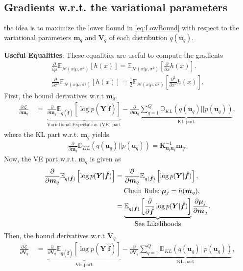 \documentclass[9pt]{article}
\providecommand{\ve}[1]{{\bm{#1}}}%
\providecommand{\mat}[1]{{\bm{#1}}} %
\DeclareMathOperator{\igual}{\!\,=\!\,}
\providecommand{\ve}[1]{{\mathbf{#1}}}
\providecommand{\mat}[1]{{\mathbf{#1}}}
\newcommand{\fracpartial}[2]{\frac{\partial #1}{\partial  #2}} %
\newcommand{\gauss}{\mathcal{N}} %
\begin{document}
\subsection{Gradients w.r.t. the variational parameters} 
the idea is to maximize the lower bound in \cref{eq:LowBound} with respect to the variational parameters $\ve{m}_q$ and $\mat{V}_q$ of each distribution $q(\ve{u}_q)$. 

\textbf{Useful Equalities}: These equalities \cite{hensman2015scalable} are useful to compute the gradients 
\begin{align}
\fracpartial{}{\mu}\mathbb{E}_{\gauss(x|\mu,\sigma^2)}\left[h(x)\right] = \mathbb{E}_{\gauss(x|\mu,\sigma^2)}\left[\fracpartial{}{x}h(x)\right].\\
\fracpartial{}{\sigma^2}\mathbb{E}_{\gauss(x|\mu,\sigma^2)}\left[h(x)\right] = \frac{1}{2}\mathbb{E}_{\gauss(x|\mu,\sigma^2)}\left[\fracpartial{^2}{x^2}h(x)\right].
\end{align}
First, the bound derivatives w.r.t $\ve{m}_q$.
\begin{align}
\fracpartial{\mathcal{L}}{\ve{m}_q} &\igual \underbrace{\fracpartial{}{\ve{m}_q}\mathbb{E}_{q(\hat{\ve{f}})}\left[\log p(\mat{Y}|\hat{\ve{f}})\right]}_{\mbox{Variational Expectation--(VE) part}} - \fracpartial{}{\ve{m}_q}\underbrace{\sum_{q=1}^{Q}\mathbb{D}_{KL}(q(\ve{u}_q)||p(\ve{u}_q))}_{\mbox{KL part}},
\end{align}
where the KL part w.r.t. $\ve{m}_q$ yields
\begin{align}
\fracpartial{}{\ve{m}_q}{\mathbb{D}_{KL}(q(\ve{u}_q)||p(\ve{u}_q))} = \mat{K}_{\ve{u}_q\ve{u}_q}^{-1}\ve{m}_q.
\end{align}
Now, the VE part w.r.t. $\ve{m}_q$ is given as 
\begin{align}
\notag\fracpartial{}{\ve{m}_q}\mathbb{E}_{q(\hat{\ve{f}})}\left[\log p(\mat{Y}|\hat{\ve{f}})\right] &= \fracpartial{}{\ve{m}_q}\mathbb{E}_{q(\hat{\ve{f}})}\left[\log p(\mat{Y}|\hat{\ve{f}})\right],\\
\notag&\quad\; \mbox{Chain Rule:}\; \bm{\mu}_j=h(\ve{m}_q),\\
&= \underbrace{\mathbb{E}_{q(\hat{\ve{f}})}\left[\fracpartial{}{\hat{\ve{f}}}\log p(\mat{Y}|\hat{\ve{f}})\right]}_{\mbox{See Likelihoods}} \fracpartial{\bm{\mu}_j}{\ve{m}_q}.
\end{align}
Then, the bound derivatives w.r.t $\mat{V}_q$
\begin{align}
\fracpartial{\mathcal{L}}{\mat{V}_q} &\igual \underbrace{\fracpartial{}{\mat{V}_q}\mathbb{E}_{q(\hat{\ve{f}})}\left[\log p(\mat{Y}|\hat{\ve{f}})\right]}_{\mbox{VE part}} - \fracpartial{}{\mat{V}_q}\underbrace{\sum_{q=1}^{Q}\mathbb{D}_{KL}(q(\ve{u}_q)||p(\ve{u}_q))}_{\mbox{KL part}},
\end{align}
\end{document}
